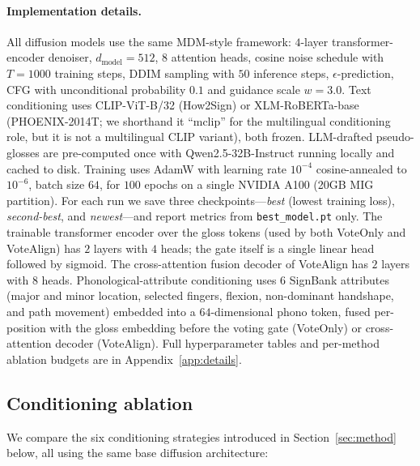 \documentclass{article}
\begin{document}
\paragraph{Implementation details.}
All diffusion models use the same MDM-style framework: $4$-layer transformer-encoder denoiser, $d_{\text{model}}=512$, $8$ attention heads, cosine noise schedule with $T=1000$ training steps, DDIM sampling with $50$ inference steps, $\epsilon$-prediction, CFG with unconditional probability $0.1$ and guidance scale $w=3.0$. Text conditioning uses CLIP-ViT-B/32 (How2Sign) or XLM-RoBERTa-base (PHOENIX-2014T; we shorthand it ``mclip'' for the multilingual conditioning role, but it is not a multilingual CLIP variant), both frozen. LLM-drafted pseudo-glosses are pre-computed once with Qwen2.5-32B-Instruct running locally and cached to disk. Training uses AdamW with learning rate $10^{-4}$ cosine-annealed to $10^{-6}$, batch size $64$, for $100$ epochs on a single NVIDIA A100 (20GB MIG partition). For each run we save three checkpoints---\emph{best} (lowest training loss), \emph{second-best}, and \emph{newest}---and report metrics from \texttt{best\_model.pt} only. The trainable transformer encoder over the gloss tokens (used by both VoteOnly and VoteAlign) has $2$ layers with $4$ heads; the gate itself is a single linear head followed by sigmoid. The cross-attention fusion decoder of VoteAlign has $2$ layers with $8$ heads. Phonological-attribute conditioning uses $6$ SignBank attributes (major and minor location, selected fingers, flexion, non-dominant handshape, and path movement) embedded into a $64$-dimensional phono token, fused per-position with the gloss embedding before the voting gate (VoteOnly) or cross-attention decoder (VoteAlign). Full hyperparameter tables and per-method ablation budgets are in Appendix~\ref{app:details}.

\subsection{Conditioning ablation}
\label{sec:ablation}

We compare the six conditioning strategies introduced in Section~\ref{sec:method} below, all using the same base diffusion architecture:
\end{document}
